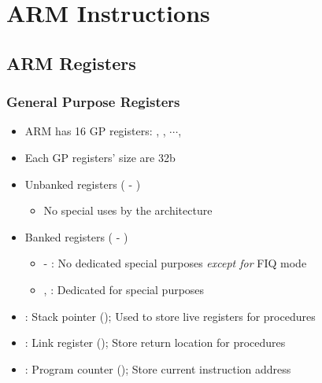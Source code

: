 \section{ARM Instructions}

\subsection{ARM Registers}

\subsubsection*{General Purpose Registers}
\begin{itemize}
    \item ARM has 16 GP registers: , , $\cdots$, 
    \item Each GP registers' size are 32b
    \item Unbanked registers ( - )
    \begin{itemize}
        \item No special uses by the architecture
    \end{itemize}
    \item Banked registers ( - )
    \begin{itemize}
        \item {} - : No dedicated special purposes \textit{except for} FIQ mode
        \item {}, : Dedicated for special purposes
    \end{itemize}
    \item {}: Stack pointer (); Used to store live registers for procedures
    \item {}: Link register (); Store return location for procedures
    \item {}: Program counter (); Store current instruction address
\end{itemize}

